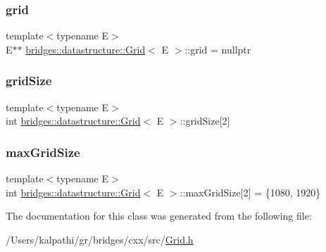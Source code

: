 \subsubsection{\texorpdfstring{grid}{grid}}
{\footnotesize\ttfamily template$<$typename E$>$ \\
E$\ast$$\ast$ \mbox{\hyperlink{classbridges_1_1datastructure_1_1_grid}{bridges\+::datastructure\+::\+Grid}}$<$ E $>$\+::grid = nullptr\hspace{0.3cm}{\ttfamily [protected]}}

\mbox{\label{classbridges_1_1datastructure_1_1_grid_a97738e6230af3e7e593e93ecfde0b731}} 
\subsubsection{\texorpdfstring{gridSize}{gridSize}}
{\footnotesize\ttfamily template$<$typename E$>$ \\
int \mbox{\hyperlink{classbridges_1_1datastructure_1_1_grid}{bridges\+::datastructure\+::\+Grid}}$<$ E $>$\+::grid\+Size\mbox{[}2\mbox{]}\hspace{0.3cm}{\ttfamily [protected]}}

\mbox{\label{classbridges_1_1datastructure_1_1_grid_acb1cca7db5fb42a0b107885f9e00ff67}} 
\subsubsection{\texorpdfstring{maxGridSize}{maxGridSize}}
{\footnotesize\ttfamily template$<$typename E$>$ \\
int \mbox{\hyperlink{classbridges_1_1datastructure_1_1_grid}{bridges\+::datastructure\+::\+Grid}}$<$ E $>$\+::max\+Grid\+Size\mbox{[}2\mbox{]} = \{1080, 1920\}\hspace{0.3cm}{\ttfamily [protected]}}



The documentation for this class was generated from the following file\+:\begin{DoxyCompactItemize}
\item 
/\+Users/kalpathi/gr/bridges/cxx/src/\mbox{\hyperlink{_grid_8h}{Grid.\+h}}\end{DoxyCompactItemize}
